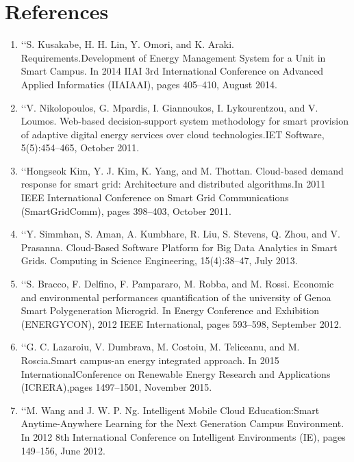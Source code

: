 \documentclass[10pt,a4paper]
{article}
\numberwithin{table}{section}
\begin{document}
{{\begin{normalsize}
\begin{enumerate}
\end{enumerate}

\newpage
\section{References}
\begin{enumerate}
\item \lq \lq  S. Kusakabe, H. H. Lin, Y. Omori, and K. Araki. Requirements.Development of Energy Management System for a Unit in Smart Campus. In 2014 IIAI 3rd International Conference on Advanced Applied Informatics (IIAIAAI), pages 405–410, August 2014.

\item \lq \lq  V. Nikolopoulos, G. Mpardis, I. Giannoukos, I. Lykourentzou, and V. Loumos. Web-based decision-support system methodology for smart provision of adaptive digital energy services over cloud technologies.IET Software, 5(5):454–465, October 2011.

\item \lq \lq  Hongseok Kim, Y. J. Kim, K. Yang, and M. Thottan. Cloud-based demand response for smart grid: Architecture and distributed algorithms.In 2011 IEEE International Conference on Smart Grid Communications (SmartGridComm), pages 398–403, October 2011.

\item \lq \lq Y. Simmhan, S. Aman, A. Kumbhare, R. Liu, S. Stevens, Q. Zhou, and V. Prasanna. Cloud-Based Software Platform for Big Data Analytics in Smart Grids. Computing in Science Engineering, 15(4):38–47, July 2013.


\item \lq \lq S. Bracco, F. Delfino, F. Pampararo, M. Robba, and M. Rossi. Economic and environmental performances quantification of the university of Genoa Smart Polygeneration Microgrid. In Energy Conference and Exhibition (ENERGYCON), 2012 IEEE International, pages 593–598, September 2012.

\item \lq \lq  G. C. Lazaroiu, V. Dumbrava, M. Costoiu, M. Teliceanu, and M. Roscia.Smart campus-an energy integrated approach. In 2015 InternationalConference on Renewable Energy Research and Applications (ICRERA),pages 1497–1501, November 2015.

\item \lq \lq  M. Wang and J. W. P. Ng. Intelligent Mobile Cloud Education:Smart Anytime-Anywhere Learning for the Next Generation Campus Environment. In 2012 8th International Conference on Intelligent Environments (IE), pages 149–156, June 2012.


\end{enumerate}
\end{normalsize}}}
\end{document}
